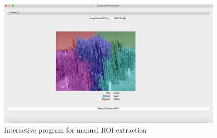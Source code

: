 \begin{figure}[ht!]
\centering
\includegraphics[scale=0.7]{Images/gui}
\caption{Interactive program for manual ROI extraction}
\label{fig1}
\end{figure}

\bigskip

\goodbreak

